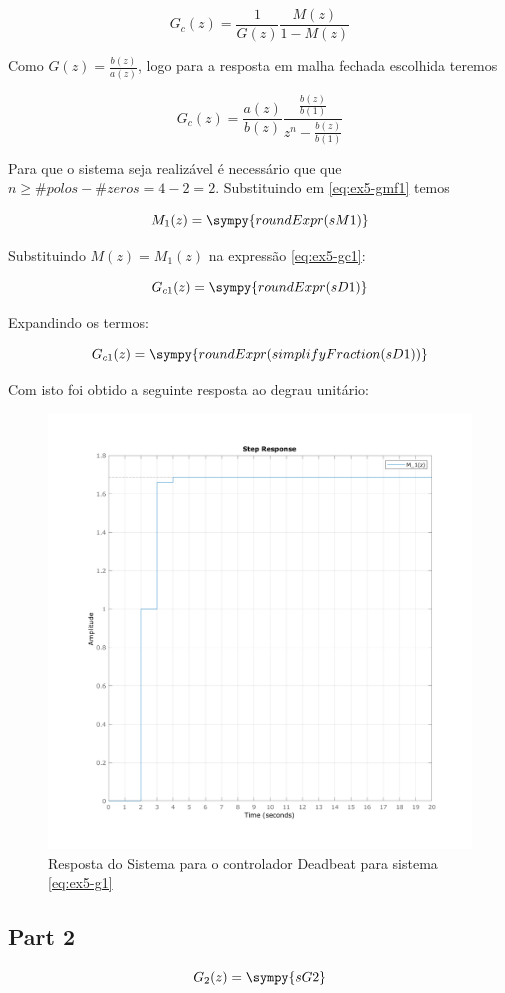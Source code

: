 \documentclass[a4paper,11pt]{article}
\begin{document}
$$
    G_{c}(z) = \frac{1}{G(z)}\frac{M(z)}{1-M(z)}
$$

Como $G(z) = \frac{b(z)}{a(z)}$, logo para a resposta em malha fechada escolhida teremos

\begin{equation}\label{eq:ex5-gc1}
    G_{c}(z) = \frac{a(z)}{b(z)}\frac{\frac{b(z)}{b(1)}}{z^n-\frac{b(z)}{b(1)}}
\end{equation}


Para que o sistema seja realizável é necessário que que $n \ge \#polos - \#zeros = 4  - 2 = 2$. Substituindo em \ref{eq:ex5-gmf1} temos

$$
M_1(z) = \sympy{roundExpr(sM1)}
$$

Substituindo $M(z) = M_1(z)$ na expressão \ref{eq:ex5-gc1}:

$$G_{c1}(z) = \sympy{roundExpr(sD1)}$$

Expandindo os termos:

$$G_{c1}(z) = \sympy{roundExpr(simplifyFraction(sD1))}$$

Com isto foi obtido a seguinte resposta ao degrau unitário:

\begin{figure}[H]
    \centering
    \includegraphics[width=0.6\linewidth]{img/exsim5-g1-deadbeat-sim.png}
    \caption{Resposta do Sistema para o controlador Deadbeat para sistema \ref{eq:ex5-g1}}
\end{figure}

\subsection{Part 2}


\begin{equation}\label{eq:ex5-g2}
    G_2(z) = \sympy{sG2}
\end{equation}
\end{document}
